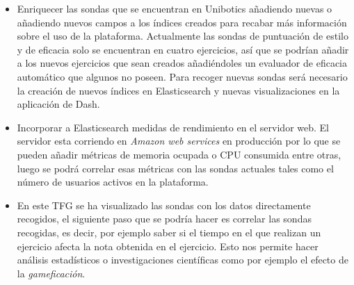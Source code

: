 		\begin{itemize}
			\item Enriquecer las sondas que se encuentran en Unibotics añadiendo nuevas o añadiendo nuevos campos a los índices creados para recabar más información sobre el uso de la plataforma. Actualmente las sondas de puntuación de estilo y de eficacia solo se encuentran en cuatro ejercicios, así que se podrían añadir a los nuevos ejercicios que sean creados añadiéndoles un evaluador de eficacia automático que algunos no poseen. Para recoger nuevas sondas será necesario la creación de nuevos índices en Elasticsearch y nuevas visualizaciones en la aplicación de Dash.\\
\item Incorporar a Elasticsearch medidas de rendimiento en el servidor web. El servidor esta corriendo en \textit{Amazon web services} en producción por lo que se pueden añadir métricas de memoria ocupada o CPU consumida entre otras, luego se podrá correlar esas métricas con las sondas actuales tales como el número de usuarios activos en la plataforma.

\item En este TFG se ha visualizado las sondas con los datos directamente recogidos, el siguiente paso que se podría hacer es correlar las sondas recogidas, es decir, por ejemplo saber si el tiempo en el que realizan un ejercicio afecta la nota obtenida en el ejercicio. Esto nos permite hacer análisis estadísticos o investigaciones científicas como por ejemplo el efecto de la \textit{gameficación}.\\
		\end{itemize}